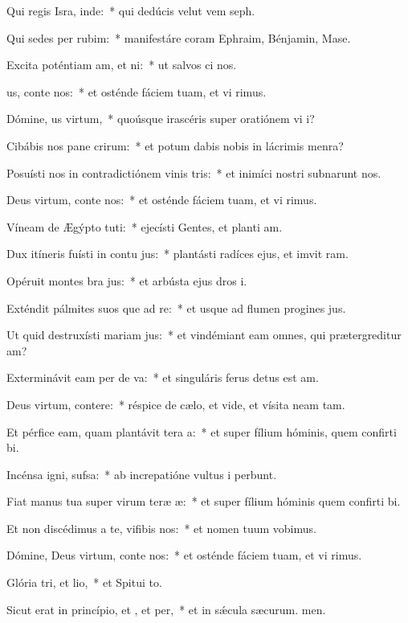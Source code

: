 \item Qui regis Isra, inde:~* qui dedúcis velut vem seph.
\item Qui sedes per rubim:~* manifestáre coram Ephraim, Bénjamin,  Mase.
\item Excita poténtiam am, et ni:~* ut salvos ci nos.
\item {}us, conte nos:~* et osténde fáciem tuam, et vi rimus.
\item Dómine, us virtum,~* quoúsque irascéris super oratiónem vi i?
\item Cibábis nos pane crirum:~* et potum dabis nobis in lácrimis  menra?
\item Posuísti nos in contradictiónem vinis tris:~* et inimíci nostri subnarunt nos.
\item Deus virtum, conte nos:~* et osténde fáciem tuam, et vi rimus.
\item Víneam de Ægýpto tuti:~* ejecísti Gentes, et planti am.
\item Dux itíneris fuísti in contu jus:~* plantásti radíces ejus, et imvit ram.
\item Opéruit montes bra jus:~* et arbústa ejus dros i.
\item Exténdit pálmites suos que ad re:~* et usque ad flumen progines jus.
\item Ut quid destruxísti mariam jus:~* et vindémiant eam omnes, qui prætergreditur am?
\item Exterminávit eam per de va:~* et singuláris ferus detus est am.
\item Deus virtum, contere:~* réspice de cælo, et vide, et vísita neam tam.
\item Et pérfice eam, quam plantávit tera a:~* et super fílium hóminis, quem confirti bi.
\item Incénsa igni,  sufsa:~* ab increpatióne vultus i perbunt.
\item Fiat manus tua super virum teræ æ:~* et super fílium hóminis quem confirti bi.
\item Et non discédimus a te, vifibis nos:~* et nomen tuum vobimus.
\item Dómine, Deus virtum, conte nos:~* et osténde fáciem tuam, et vi rimus.
\item Glória tri, et lio,~* et Spitui to.
\item Sicut erat in princípio, et , et per,~* et in sǽcula sæcurum. men.
